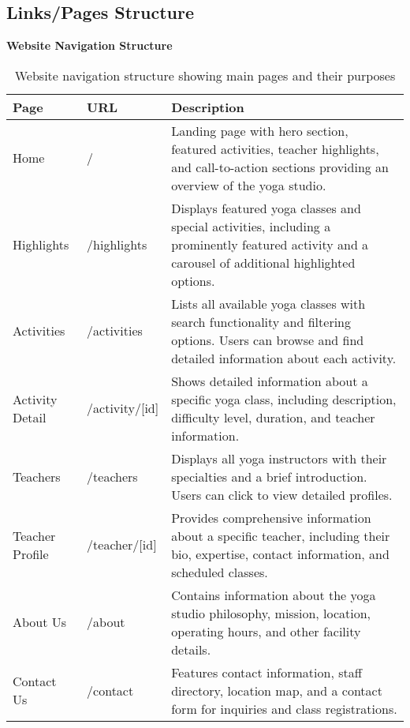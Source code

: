 \subsection{Links/Pages Structure}

\begin{table}[H]
    \centering
    \caption*{\textbf{Website Navigation Structure}}
    \begin{tabular}{|p{2.5cm}|p{3cm}|p{8cm}|}
        \hline
        \rowcolor{bluepoli!20}
        \textbf{Page} & \textbf{URL} & \textbf{Description} \\
        \hline
        Home & / & Landing page with hero section, featured activities, teacher highlights, and call-to-action sections providing an overview of the yoga studio. \\
        \hline
        Highlights & /highlights & Displays featured yoga classes and special activities, including a prominently featured activity and a carousel of additional highlighted options. \\
        \hline
        Activities & /activities & Lists all available yoga classes with search functionality and filtering options. Users can browse and find detailed information about each activity. \\
        \hline
        Activity Detail & /activity/[id] & Shows detailed information about a specific yoga class, including description, difficulty level, duration, and teacher information. \\
        \hline
        Teachers & /teachers & Displays all yoga instructors with their specialties and a brief introduction. Users can click to view detailed profiles. \\
        \hline
        Teacher Profile & /teacher/[id] & Provides comprehensive information about a specific teacher, including their bio, expertise, contact information, and scheduled classes. \\
        \hline
        About Us & /about & Contains information about the yoga studio philosophy, mission, location, operating hours, and other facility details. \\
        \hline
        Contact Us & /contact & Features contact information, staff directory, location map, and a contact form for inquiries and class registrations. \\
        \hline
    \end{tabular}
    \caption{Website navigation structure showing main pages and their purposes}
\end{table}

